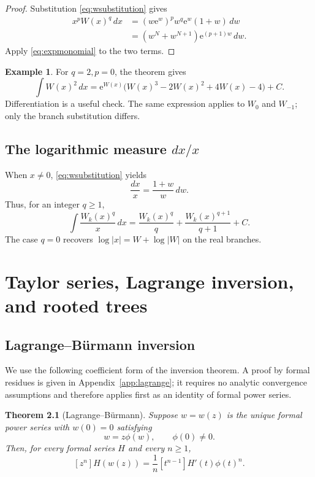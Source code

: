 \documentclass[11pt,oneside]{book}
\newtheorem{theorem}{Theorem}[chapter]
\theoremstyle{definition}
\newtheorem{example}[theorem]{Example}
\theoremstyle{remark}
\newcommand{\ee}{\mathrm e}
\begin{document}
\begin{proof}
Substitution \eqref{eq:wsubstitution} gives
\begin{align*}
 x^pW(x)^q\,dx
 &=(w\ee^w)^p w^q\ee^w(1+w)\,dw\\
 &=(w^N+w^{N+1})\ee^{(p+1)w}\,dw.
\end{align*}
Apply \eqref{eq:expmonomial} to the two terms.
\end{proof}

\begin{example}
For $q=2,p=0$, the theorem gives
\[
 \int W(x)^2\,dx
 =\ee^{W(x)}\bigl(W(x)^3-2W(x)^2+4W(x)-4\bigr)+C.
\]
Differentiation is a useful check.  The same expression applies to $W_0$ and
$W_{-1}$; only the branch substitution differs.
\end{example}

\section{The logarithmic measure $dx/x$}

When $x\ne0$, \eqref{eq:wsubstitution} yields
\begin{equation}\label{eq:dxx}
 \frac{dx}{x}=\frac{1+w}{w}\,dw.
\end{equation}
Thus, for an integer $q\ge1$,
\begin{equation}\label{eq:intWqoverx}
 \int\frac{W_k(x)^q}{x}\,dx
 =\frac{W_k(x)^q}{q}+\frac{W_k(x)^{q+1}}{q+1}+C.
\end{equation}
The case $q=0$ recovers $\log|x|=W+\log|W|$ on the real branches.

\chapter{Taylor series, Lagrange inversion, and rooted trees}\label{ch:series}

\section{Lagrange--Bürmann inversion}

We use the following coefficient form of the inversion theorem.  A proof by
formal residues is given in Appendix~\ref{app:lagrange}; it requires no
analytic convergence assumptions and therefore applies first as an identity
of formal power series.

\begin{theorem}[Lagrange--Bürmann]\label{thm:lagrange}
Suppose $w=w(z)$ is the unique formal power series with $w(0)=0$ satisfying
\begin{equation}\label{eq:lagrangeform}
 w=z\phi(w),\qquad \phi(0)\ne0.
\end{equation}
Then, for every formal series $H$ and every $n\ge1$,
\begin{equation}\label{eq:lagrangeformula}
 [z^n]H(w(z))=\frac1n[t^{n-1}]H'(t)\phi(t)^n.
\end{equation}
\end{theorem}
\end{document}
